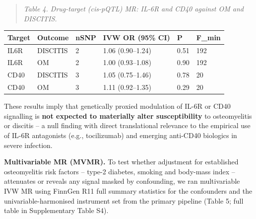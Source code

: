 \documentclass[11pt]{article}
\begin{document}
\begin{quote}\emph{Table 4. Drug-target (cis-pQTL) MR: IL-6R and CD40 against OM and DISCITIS.}\end{quote}
\begin{table}[ht]\centering
\begin{tabular}{llllll}
\toprule
Target & Outcome & nSNP & IVW OR (95\% CI) & P & F\_min \\
\midrule
IL6R & DISCITIS & 2 & 1.06 (0.90--1.24) & 0.51 & 192 \\
IL6R & OM & 2 & 1.00 (0.93--1.08) & 0.90 & 192 \\
CD40 & DISCITIS & 3 & 1.05 (0.75--1.46) & 0.78 & 20 \\
CD40 & OM & 3 & 1.11 (0.92--1.35) & 0.29 & 20 \\
\bottomrule
\end{tabular}
\end{table}
These results imply that genetically proxied modulation of IL-6R or CD40 signalling is \textbf{not expected to materially alter susceptibility} to osteomyelitis or discitis -- a null finding with direct translational relevance to the empirical use of IL-6R antagonists (e.g., tocilizumab) and emerging anti-CD40 biologics in severe infection.

\textbf{Multivariable MR (MVMR).} To test whether adjustment for established osteomyelitis risk factors -- type-2 diabetes, smoking and body-mass index -- attenuates or reveals any signal masked by confounding, we ran multivariable IVW MR using FinnGen R11 full summary statistics for the confounders and the univariable-harmonised instrument set from the primary pipeline (Table 5; full table in Supplementary Table S4).
\end{document}

